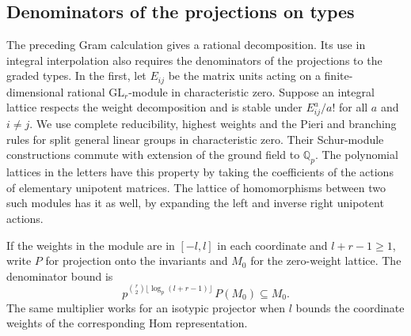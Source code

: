\subsection{Denominators of the projections on types}
\hypertarget{source-graded-projectors}{}

The preceding Gram calculation gives a rational decomposition. Its use in integral interpolation also requires the denominators of the projections to the graded types. In the
first, let \(E_{ij}\) be the matrix units acting on a
finite-dimensional rational \(\mathrm{GL}_r\)-module in
characteristic zero. Suppose an integral lattice respects the
weight decomposition and is stable under
\(E_{ij}^{a}/a!\) for all \(a\) and \(i\ne j\). We use complete reducibility, highest weights and the Pieri
and branching rules for split general linear groups in
characteristic zero. Their Schur-module constructions
commute with extension of the ground field to
\(\mathbb Q_p\). \cite{fulton-harris}
The polynomial
lattices in the letters have this property by taking the
coefficients of the actions of elementary unipotent matrices.
The lattice of homomorphisms between two such modules has it
as well, by expanding the left and inverse right unipotent
actions.

\begin{lemma}
\label{lem:integral-type-projection}
If the weights in the module are in \([-l,l]\) in each coordinate and
\(l+r-1\ge1\), write \(P\) for projection onto the invariants and \(M_0\) for the zero-weight lattice. The denominator bound is
\[
 p^{\binom r2\lfloor\log_p(l+r-1)\rfloor}\,P(M_0)\subseteq M_0.
\]
 The same multiplier
works for an isotypic projector when \(l\) bounds the coordinate weights
of the corresponding Hom representation.
\end{lemma}


